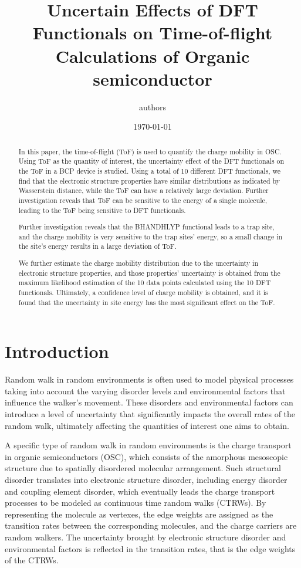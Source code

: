 \documentclass[letterpaper,12pt]{article}
\begin{document}
\linenumbers
\title{Uncertain Effects of DFT Functionals on Time-of-flight Calculations of Organic semiconductor }
\author{authors}
\date{\today}
\maketitle

\begin{abstract}
In this paper, the time-of-flight (ToF) is used to quantify the charge mobility in OSC. 
Using ToF as the quantity of interest, the uncertainty effect of the DFT functionals on the ToF in a BCP device is studied. 
Using a total of 10 different DFT functionals, we find that the electronic structure properties have similar distributions as indicated by Wasserstein distance, while the ToF can have a relatively large deviation.
Further investigation reveals that ToF can be sensitive to the energy of a single molecule, leading to the ToF being sensitive to DFT functionals.

Further investigation reveals that the BHANDHLYP functional leads to a trap site, and the charge mobility is very sensitive to the trap sites' energy, so a small change in the site's energy results in a large deviation of ToF.  

We further estimate the charge mobility distribution due to the uncertainty in electronic structure properties, and those properties' uncertainty is obtained from the maximum likelihood estimation of the 10 data points calculated using the 10 DFT functionals.
Ultimately, a confidence level of charge mobility is obtained, and it is found that the uncertainty in site energy has the most significant effect on the ToF. 
\end{abstract}

\section{Introduction}
Random walk in random environments is often used to model physical processes taking into account the varying disorder levels and environmental factors that influence the walker's movement. 
These disorders and environmental factors can introduce a level of uncertainty that significantly impacts the overall rates of the random walk, ultimately affecting the quantities of interest one aims to obtain.

A specific type of random walk in random environments is the charge transport in organic semiconductors (OSC), which consists of the amorphous mesoscopic structure due to spatially disordered molecular arrangement. 
Such structural disorder translates into electronic structure disorder, including energy disorder and coupling element disorder, which eventually leads the charge transport processes to be modeled as continuous time random walks (CTRWs). By representing the molecule as vertexes, the edge weights are assigned as the transition rates between the corresponding molecules, and the charge carriers are random walkers. 
The uncertainty brought by electronic structure disorder and environmental factors is reflected in the transition rates, that is the edge weights of the CTRWs. 
\end{document}
